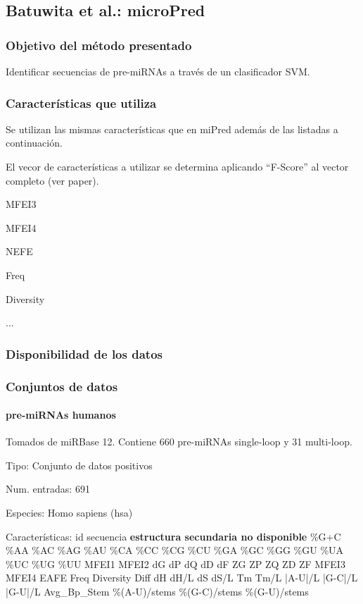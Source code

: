 \documentclass[12pt,bibliography=openstyle,DIV=12,parskip=half-]{scrartcl}
\begin{document}
\subsection{Batuwita et al.: microPred}
\subsubsection{Objetivo del método presentado}
Identificar secuencias de pre-miRNAs a través de un clasificador SVM.
\subsubsection{Características que utiliza}
Se utilizan las mismas características que en miPred además de las
listadas a continuación.

El vecor de características a utilizar se determina aplicando ``F-Score''
al vector completo (ver paper).
\begin{itemize*}
\item MFEI3
\item MFEI4
\item NEFE
\item Freq
\item Diversity
\item ...
\end{itemize*}
\subsubsection{Disponibilidad de los datos}

%
\subsubsection{Conjuntos de datos}
\paragraph{pre-miRNAs humanos}
Tomados de miRBase 12. Contiene 660 pre-miRNAs single-loop y 31 multi-loop.
\begin{description*}
\item[Tipo:] Conjunto de datos positivos
\item[Num. entradas:] 691
\item[Especies:] Homo sapiens (hsa)
\item[Características:]
id \quad secuencia \quad \textbf{estructura secundaria no disponible}
\quad \%G+C \quad \%AA \quad \%AC \quad \%AG \quad \%AU \quad \%CA
\quad \%CC \quad \%CG \quad \%CU \quad \%GA \quad \%GC \quad \%GG
\quad \%GU \quad \%UA \quad \%UC \quad \%UG \quad \%UU \quad MFEI1
\quad MFEI2 \quad dG \quad dP \quad dQ \quad dD \quad dF \quad ZG
\quad ZP \quad ZQ \quad ZD \quad ZF \quad MFEI3 \quad MFEI4 \quad EAFE
\quad Freq \quad Diversity \quad Diff \quad dH \quad dH/L \quad dS
\quad dS/L \quad Tm \quad Tm/L \quad |A-U|/L \quad |G-C|/L \quad
|G-U|/L \quad Avg\_Bp\_Stem \quad \%(A-U)/stems \quad \%(G-C)/stems
\quad \%(G-U)/stems
\end{description*}
\end{document}
